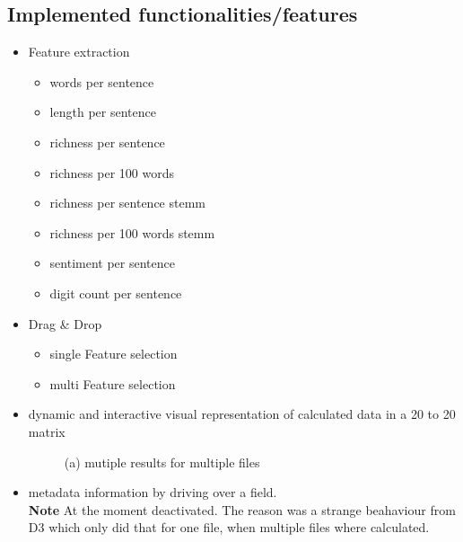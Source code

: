 \documentclass[runningheads]{llncs}
\begin{document}
\subsection{Implemented functionalities/features}

\begin{itemize}
    \item Feature extraction
    \begin{itemize}
        \item words per sentence
        \item length per sentence
        \item richness per sentence
        \item richness per 100 words
        \item richness per sentence stemm
        \item richness per 100 words stemm
        \item sentiment per sentence
        \item digit count per sentence
    \end{itemize}
    \item Drag \& Drop
    \begin{itemize}
        \item single Feature selection
        \item multi Feature selection
    \end{itemize}
    \item dynamic and interactive visual representation of calculated data in a 20 to 20 matrix 
    \begin{figure}
        \centering
        \caption{(a) mutiple results for multiple files}
        \label{fig:heatmap}
    \end{figure}
    \item metadata information by driving over a field. \\
    \textbf{Note} At the moment deactivated. The reason was a strange beahaviour from D3 which only did that for one file, when multiple files where calculated.

\end{itemize}
\end{document}
